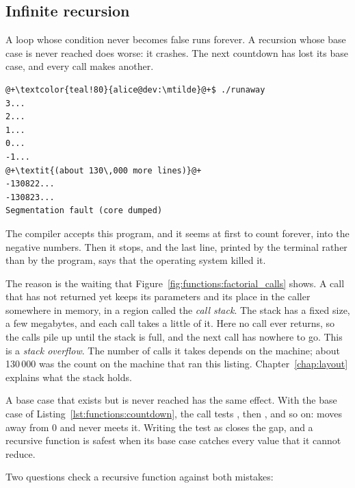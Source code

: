 \subsection{Infinite recursion}
\label{sec:functions:infinite_recursion}

A loop whose condition never becomes false runs forever. A recursion whose base
case is never reached does worse: it crashes. The next countdown has lost its
base case, and every call makes another.


\vspace{-10pt}%
\begin{lstlisting}[style=bashVerb, escapechar=@+]
@+\textcolor{teal!80}{alice@dev:\mtilde}@+$ ./runaway
3...
2...
1...
0...
-1...
@+\textit{(about 130\,000 more lines)}@+
-130822...
-130823...
Segmentation fault (core dumped)
\end{lstlisting}

The compiler accepts this program, and it seems at first to count forever, into
the negative numbers. Then it stops, and the last line, printed by the terminal
rather than by the program, says that the operating system killed it.

The reason is the waiting that Figure~\ref{fig:functions:factorial_calls} shows.
A call that has not returned yet keeps its parameters and its place in the
caller somewhere in memory, in a region called the \textit{call stack}. The
stack has a fixed size, a few megabytes, and each call takes a little of it.
Here no call ever returns, so the calls pile up until the stack is full, and the
next call has nowhere to go. This is a \textit{stack overflow}. The number of
calls it takes depends on the machine; about 130\,000 was the count on the
machine that ran this listing. Chapter~\ref{chap:layout} explains what the stack
holds.

A base case that exists but is never reached has the same effect. With the base
case of Listing~\ref{lst:functions:countdown}, the call 
tests , then , and so on:  moves away from
0 and never meets it. Writing the test as  closes the gap, and a
recursive function is safest when its base case catches every value that it
cannot reduce.

Two questions check a recursive function against both mistakes:

